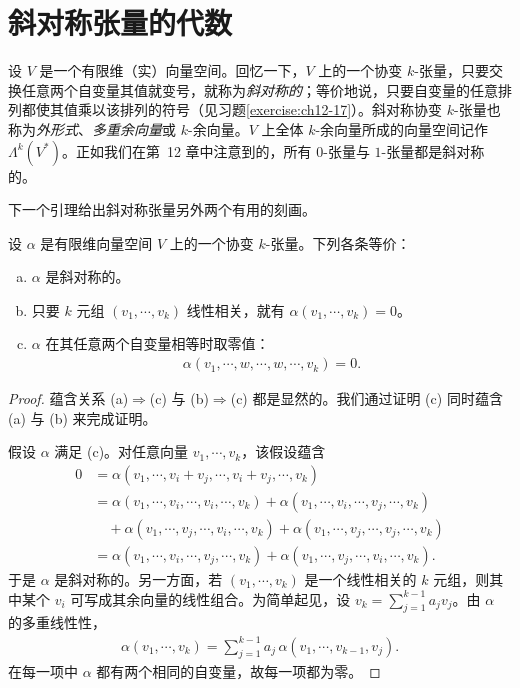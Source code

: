 \documentclass[../../main.tex]{subfiles}
\begin{document}
\section{斜对称张量的代数}\label{section:ch14-alternating-tensors}

设 $V$ 是一个有限维（实）向量空间。回忆一下，$V$ 上的一个协变 $k$-张量，只要交换任意两个自变量其值就变号，就称为\emph{斜对称的}；等价地说，只要自变量的任意排列都使其值乘以该排列的符号（见习题\ref{exercise:ch12-17}）。斜对称协变 $k$-张量也称为\emph{外形式}、\emph{多重余向量}或 $k$-余向量。$V$ 上全体 $k$-余向量所成的向量空间记作 $\Lambda^k(V^*)$。正如我们在第~12 章中注意到的，所有 $0$-张量与 $1$-张量都是斜对称的。

下一个引理给出斜对称张量另外两个有用的刻画。

\begin{lemma}\label{lemma:ch14-alternating-equiv}
设 $\alpha$ 是有限维向量空间 $V$ 上的一个协变 $k$-张量。下列各条等价：
\begin{enumerate}[(a)]
\item $\alpha$ 是斜对称的。
\item 只要 $k$ 元组 $(v_1,\cdots ,v_k)$ 线性相关，就有 $\alpha(v_1,\cdots ,v_k)=0$。
\item $\alpha$ 在其任意两个自变量相等时取零值：
\begin{align*}
\alpha(v_1,\cdots ,w,\cdots ,w,\cdots ,v_k)=0.
\end{align*}
\end{enumerate}
\end{lemma}

\begin{proof}
蕴含关系 (a)$\Rightarrow$(c) 与 (b)$\Rightarrow$(c) 都是显然的。我们通过证明 (c) 同时蕴含 (a) 与 (b) 来完成证明。

假设 $\alpha$ 满足 (c)。对任意向量 $v_1,\cdots ,v_k$，该假设蕴含
\begin{align*}
0&=\alpha(v_1,\cdots ,v_i+v_j,\cdots ,v_i+v_j,\cdots ,v_k)\\
&=\alpha(v_1,\cdots ,v_i,\cdots ,v_i,\cdots ,v_k)+\alpha(v_1,\cdots ,v_i,\cdots ,v_j,\cdots ,v_k)\\
&\quad+\alpha(v_1,\cdots ,v_j,\cdots ,v_i,\cdots ,v_k)+\alpha(v_1,\cdots ,v_j,\cdots ,v_j,\cdots ,v_k)\\
&=\alpha(v_1,\cdots ,v_i,\cdots ,v_j,\cdots ,v_k)+\alpha(v_1,\cdots ,v_j,\cdots ,v_i,\cdots ,v_k).
\end{align*}
于是 $\alpha$ 是斜对称的。另一方面，若 $(v_1,\cdots ,v_k)$ 是一个线性相关的 $k$ 元组，则其中某个 $v_i$ 可写成其余向量的线性组合。为简单起见，设 $v_k=\sum_{j=1}^{k-1}a_jv_j$。由 $\alpha$ 的多重线性性，
\begin{align*}
\alpha(v_1,\cdots ,v_k)=\sum_{j=1}^{k-1}a_j\,\alpha(v_1,\cdots ,v_{k-1},v_j).
\end{align*}
在每一项中 $\alpha$ 都有两个相同的自变量，故每一项都为零。
\end{proof}
\end{document}
